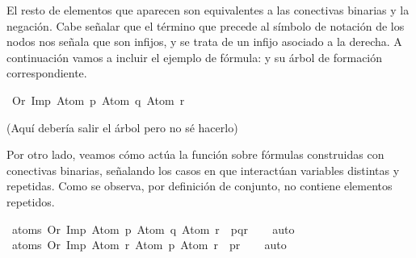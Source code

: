\begin{isabellebody}
\begin{isamarkuptext}
El resto de elementos que aparecen son equivalentes a las conectivas binarias y la negación. 
Cabe señalar que el término  que precede al símbolo de notación de los nodos nos señala que 
son infijos, y  se trata de un infijo asociado a la derecha.
A continuación vamos a incluir el ejemplo de fórmula:  y su árbol de formación 
correspondiente.%
\end{isamarkuptext}\isamarkuptrue%
\isamarkupfalse%
\ {\isachardoublequoteopen}Or\ {\isacharparenleft}Imp\ {\isacharparenleft}Atom\ p{\isacharparenright}\ {\isacharparenleft}Atom\ q{\isacharparenright}{\isacharparenright}\ {\isacharparenleft}Atom\ r{\isacharparenright}{\isachardoublequoteclose}%
\begin{isamarkuptext}%
(Aquí debería salir el árbol pero no sé hacerlo)%
\end{isamarkuptext}\isamarkuptrue%
%
\begin{isamarkuptext}%
Por otro lado, veamos cómo actúa la función  sobre fórmulas construidas con 
conectivas binarias, señalando los casos en que interactúan variables distintas y repetidas. 
Como se observa, por definición de conjunto, no contiene elementos repetidos.%
\end{isamarkuptext}\isamarkuptrue%
\isamarkupfalse%
\ {\isachardoublequoteopen}atoms\ {\isacharparenleft}Or\ {\isacharparenleft}Imp\ {\isacharparenleft}Atom\ p{\isacharparenright}\ {\isacharparenleft}Atom\ q{\isacharparenright}{\isacharparenright}\ {\isacharparenleft}Atom\ r{\isacharparenright}{\isacharparenright}\ {\isacharequal}\ {\isacharbraceleft}p{\isacharcomma}q{\isacharcomma}r{\isacharbraceright}{\isachardoublequoteclose}\isanewline
%
\isadelimproof
\ \ %
\endisadelimproof
%
\isatagproof
{}\isamarkupfalse%
\ auto%
\endisatagproof
{\isafoldproof}%
%
\isadelimproof
\isanewline
%
\endisadelimproof
\isanewline
{}\isamarkupfalse%
\ {\isachardoublequoteopen}atoms\ {\isacharparenleft}Or\ {\isacharparenleft}Imp\ {\isacharparenleft}Atom\ r{\isacharparenright}\ {\isacharparenleft}Atom\ p{\isacharparenright}{\isacharparenright}\ {\isacharparenleft}Atom\ r{\isacharparenright}{\isacharparenright}\ {\isacharequal}\ {\isacharbraceleft}p{\isacharcomma}r{\isacharbraceright}{\isachardoublequoteclose}\isanewline
%
\isadelimproof
\ \ %
\endisadelimproof
%
\isatagproof
{}\isamarkupfalse%
\ auto%
\endisatagproof
{\isafoldproof}%
%
\isadelimproof
%
\endisadelimproof
%
\begin{isamarkuptext}%

\end{isamarkuptext}
\end{isabellebody}
